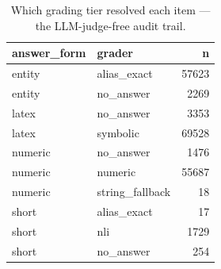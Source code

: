 \begin{table}
\caption{Which grading tier resolved each item — the LLM-judge-free audit trail.}
\label{tab:t4_grader_tier_usage}
\begin{tabular}{llr}
\toprule
answer\_form & grader & n \\
\midrule
entity & alias\_exact & 57623 \\
entity & no\_answer & 2269 \\
latex & no\_answer & 3353 \\
latex & symbolic & 69528 \\
numeric & no\_answer & 1476 \\
numeric & numeric & 55687 \\
numeric & string\_fallback & 18 \\
short & alias\_exact & 17 \\
short & nli & 1729 \\
short & no\_answer & 254 \\
\bottomrule
\end{tabular}
\end{table}
